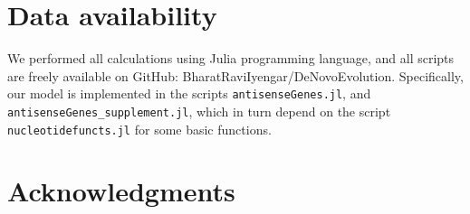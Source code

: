 \documentclass[12pt,a4paper]{article}
\begin{document}
\section*{Data availability}
We performed all calculations using Julia programming language, and all scripts are freely available on GitHub: BharatRaviIyengar/DeNovoEvolution. Specifically, our model is implemented in the scripts \texttt{antisenseGenes.jl}, and  \texttt{antisenseGenes\_supplement.jl}, which in turn depend on the script \texttt{nucleotidefuncts.jl} for some basic functions.

\section*{Acknowledgments}



\small

\end{document}
